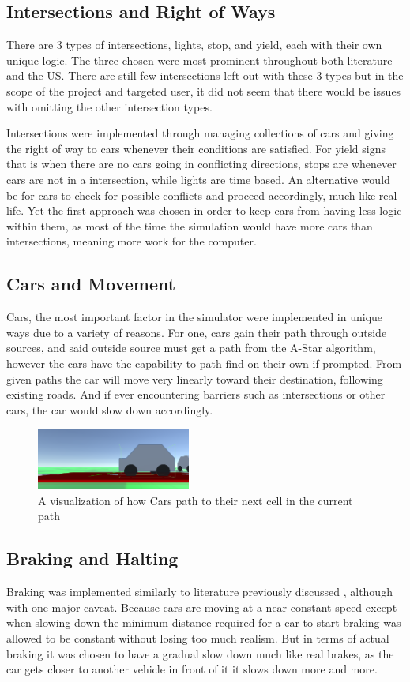 \documentclass[10pt,twocolumn]{article}
\begin{document}
\subsection{Intersections and Right of Ways}
There are 3 types of intersections, lights, stop, and yield, each with their own unique logic. The three chosen were most prominent throughout both literature and the US. There are still few intersections left out with these 3 types but in the scope of the project and targeted user, it did not seem that there would be issues with omitting the other intersection types.

Intersections were implemented through managing collections of cars and giving the right of way to cars whenever their conditions are satisfied. For yield signs that is when there are no cars going in conflicting directions, stops are whenever cars are not in a intersection, while lights are time based. An alternative would be for cars to check for possible conflicts and proceed accordingly, much like real life. Yet the first approach was chosen in order to keep cars from having less logic within them, as most of the time the simulation would have more cars than intersections, meaning more work for the computer.
\subsection{Cars and Movement}
Cars, the most important factor in the simulator were implemented in unique ways due to a variety of reasons. For one, cars gain their path through outside sources, and said outside source must get a path from the A-Star algorithm, however the cars have the capability to path find on their own if prompted. From given paths the car will move very linearly toward their destination, following existing roads. And if ever encountering barriers such as intersections or other cars, the car would slow down accordingly.
\begin{figure}[h]
\caption{A visualization of how Cars path to their next cell in the current path}
\includegraphics[width=0.45\textwidth]{Nextcell.png}
\end{figure}
\subsection{Braking and Halting}
Braking was implemented similarly to literature previously discussed \cite{roadTrafficModeling}, although with one major caveat. Because cars are moving at a near constant speed except when slowing down the minimum distance required for a car to start braking was allowed to be constant without losing too much realism. But in terms of actual braking it was chosen to have a gradual slow down much like real brakes, as the car gets closer to another vehicle in front of it it slows down more and more. 
\end{document}
